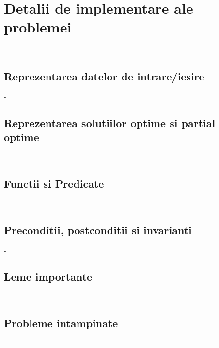 \chapter{Detalii de implementare ale problemei}

-

\section{Reprezentarea datelor de intrare/iesire}

-

\section{Reprezentarea solutiilor optime si partial optime}

-

\section{Functii si Predicate}

-

\section{Preconditii, postconditii si invarianti}

-

\section{Leme importante}

-

\section{Probleme intampinate}

-
